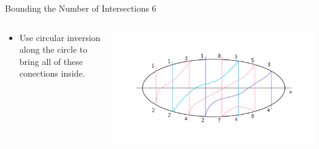 \documentclass[10pt,aspectratio=169]{beamer}
\theoremstyle{plain}
\begin{document}
\begin{frame}{Bounding the Number of Intersections 6}
    \begin{columns}
    \begin{column}{0.35\textwidth}
        \begin{itemize}
            \item Use circular inversion along the circle to bring all of these conections inside.
        \end{itemize}
    \end{column}
    \begin{column}{0.65\textwidth}
        \begin{center}
            \includegraphics[width=\textwidth]{images/figure-7.pdf}
        \end{center}
    \end{column}
    \end{columns}
\end{frame}
\end{document}
